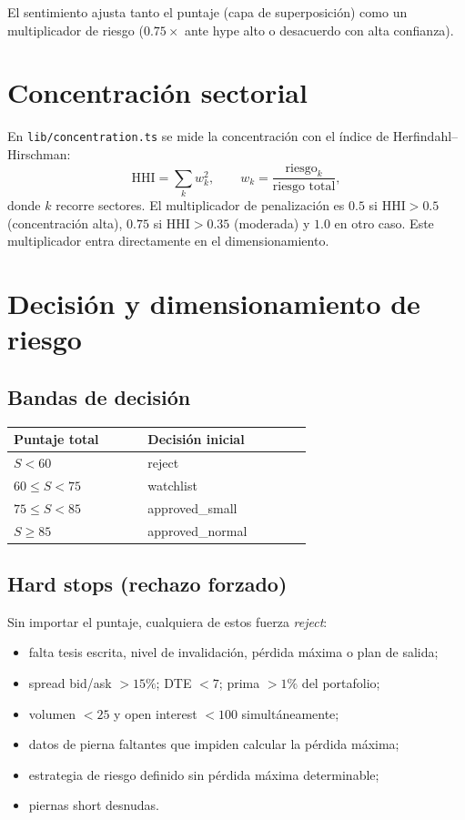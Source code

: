 \documentclass[11pt,letterpaper]{article}
\begin{document}
\noindent
El sentimiento ajusta tanto el puntaje (capa de superposición) como un
multiplicador de riesgo ($0.75\times$ ante hype alto o desacuerdo con alta
confianza).

\section{Concentración sectorial}

En \texttt{lib/concentration.ts} se mide la concentración con el índice de
Herfindahl--Hirschman:
\begin{equation}
\text{HHI} = \sum_k w_k^2, \qquad w_k = \frac{\text{riesgo}_k}{\text{riesgo total}},
\end{equation}
donde $k$ recorre sectores. El multiplicador de penalización es $0.5$ si
$\text{HHI}>0.5$ (concentración alta), $0.75$ si $\text{HHI}>0.35$ (moderada) y
$1.0$ en otro caso. Este multiplicador entra directamente en el dimensionamiento.

\section{Decisión y dimensionamiento de riesgo}

\subsection{Bandas de decisión}
\begin{longtable}{p{0.30\linewidth} p{0.35\linewidth}}
\toprule
\textbf{Puntaje total} & \textbf{Decisión inicial} \\
\midrule
$S<60$ & reject \\
$60\le S<75$ & watchlist \\
$75\le S<85$ & approved\_small \\
$S\ge 85$ & approved\_normal \\
\bottomrule
\end{longtable}

\subsection{Hard stops (rechazo forzado)}
Sin importar el puntaje, cualquiera de estos fuerza \emph{reject}:
\begin{itemize}[noitemsep]
  \item falta tesis escrita, nivel de invalidación, pérdida máxima o plan de salida;
  \item spread bid/ask $>15\%$; DTE $<7$; prima $>1\%$ del portafolio;
  \item volumen $<25$ y open interest $<100$ simultáneamente;
  \item datos de pierna faltantes que impiden calcular la pérdida máxima;
  \item estrategia de riesgo definido sin pérdida máxima determinable;
  \item piernas short desnudas.
\end{itemize}
\end{document}
